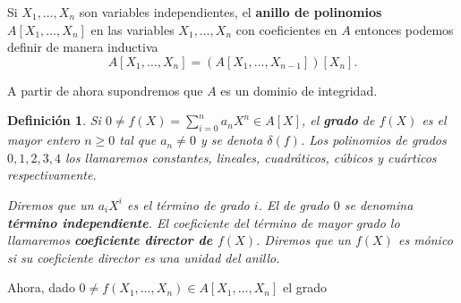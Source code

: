 \documentclass[12pt]{article}
\newtheorem{definition}[theorem]{Definición}
\begin{document}
Si $X_1, \ldots, X_n$ son variables independientes, el \textbf{anillo de polinomios} $A[X_1, \ldots, X_n]$ en las variables $X_1, \ldots, X_n$ con coeficientes en $A$ entonces podemos definir de manera inductiva $$A[X_1, \ldots, X_n] = (A[X_1, \ldots, X_{n-1}])[X_n].$$

A partir de ahora supondremos que $A$ es un dominio de integridad.

\begin{definition}Si $0 \neq f(X) = \sum_{i=0}^n a_nX^n \in A[X]$, el \textbf{grado} de $f(X)$ es el mayor entero $n \geq 0$ tal que $a_n \neq 0$ y se denota $\delta (f)$. Los polinomios de grados $0,1,2,3,4$ los llamaremos constantes, lineales, cuadráticos, cúbicos y cuárticos respectivamente.

Diremos que un $a_iX^i$ es el término de grado $i$. El de grado $0$ se denomina \textbf{término independiente}. El coeficiente del término de mayor grado lo llamaremos \textbf{coeficiente director de $f(X)$}. Diremos que un $f(X)$ es mónico si su coeficiente director es una unidad del anillo.
\end{definition}

Ahora, dado $0 \neq f(X_1, \ldots, X_n) \in A[X_1,\ldots, X_n]$ el grado 
\end{document}
